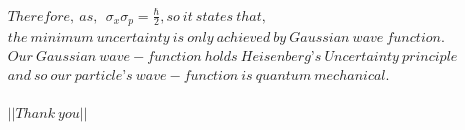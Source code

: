 \documentclass{article}
\begin{document}
\begin{homeworkProblem}
\begin{align*}
  &Therefore,\ as,\ \ \sigma_{x}\sigma_{p}=\frac{\hbar}{2},so\ it\ states\ that,\\
  &the\ minimum\ uncertainty\ is\ only\ achieved\ by\ Gaussian\ wave\ function.\\ 
  &Our\ Gaussian\ wave-function\ holds\ Heisenberg’s\ Uncertainty\ principle\\
  &and\ so\ our\ particle’s\ wave-function\ is\ quantum\ mechanical.\\\\\\\\
  &||Thank\ you||
\end{align*}
\end{homeworkProblem}
\pagebreak

















\end{document}
